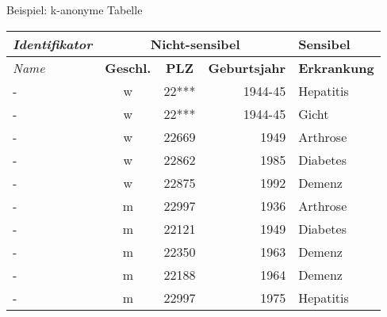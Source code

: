 \begin{frame}{Beispiel: k-anonyme Tabelle}
	\begin{center}
		\begin{tabular}{|l|c|c|r|l|}
		\hline \textit{Identifikator} & \multicolumn{3}{c|}{\textbf{Nicht-sensibel}} & \textbf{Sensibel} \\ 
		\hline \textit{Name} & \textbf{Geschl.} & \textbf{PLZ} & \textbf{Geburtsjahr} & \textbf{Erkrankung} \\ \hline
		\hline \rowcolor{svshellblau1!30} - & w & 22*** & 1944-45 & Hepatitis \\ 
		\hline \rowcolor{svshellblau1!30} - & w & 22*** & 1944-45 & Gicht \\
		\hline - & w & 22669 & 1949 & Arthrose \\ 
		\hline - & w & 22862 & 1985 & Diabetes \\ 
		\hline - & w & 22875 & 1992 & Demenz \\  
		\hline - & m & 22997 & 1936 & Arthrose \\ 
		\hline - & m & 22121 & 1949 & Diabetes \\ 
		\hline - & m & 22350 & 1963 & Demenz \\ 
		\hline - & m & 22188 & 1964 & Demenz \\ 
		\hline - & m & 22997 & 1975 & Hepatitis \\ 
		\hline 
		\end{tabular}
	\end{center}
\end{frame}

